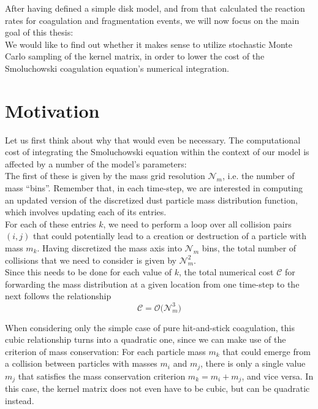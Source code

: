 After having defined a simple disk model, and from that calculated the reaction rates for 
coagulation and fragmentation events, we will now focus on the main goal of this thesis: \\

We would like to find out whether it makes sense to utilize stochastic Monte Carlo sampling of the 
kernel matrix, in order to lower the cost of the Smoluchowski coagulation equation's numerical 
integration.

\section{Motivation}

    Let us first think about why that would even be necessary.
    The computational cost of integrating the Smoluchowski equation within the context of our 
    model is affected by a number of the model's parameters: \\

    The first of these is given by the mass grid resolution $\mathcal N_m$, i.e. the number of 
    mass ``bins''. Remember that, in each time-step, we are interested in computing an updated 
    version of the discretized dust particle mass distribution function, which involves 
    updating each of its entries. \\

    For each of these entries $k$, we need to perform a loop over all collision pairs $(i, j)$ that 
    could potentially lead to a creation or destruction of a particle with mass $m_k$. 
    Having discretized the mass axis into $\mathcal N_m$ bins, the total number of collisions that
    we need to consider is given by $\mathcal N_m^2$. \\

    Since this needs to be done for each value of $k$, the total numerical cost $\mathcal C$ for 
    forwarding the mass distribution at a given location from one time-step to the next follows the 
    relationship
    \begin{equation}
        \mathcal C = \mathcal O\big( \mathcal N_m^3 \big)
    \end{equation}

    When considering only the simple case of pure hit-and-stick coagulation, this cubic 
    relationship turns into a quadratic one, since we can make use of the criterion of mass 
    conservation: For each particle mass $m_k$ that could emerge from a collision between 
    particles with masses $m_i$ and $m_j$, there is only a single value $m_j$ that satisfies the 
    mass conservation criterion $m_k = m_i + m_j$, and vice versa. In this case, the kernel matrix 
    does not even have to be cubic, but can be quadratic instead. \\

